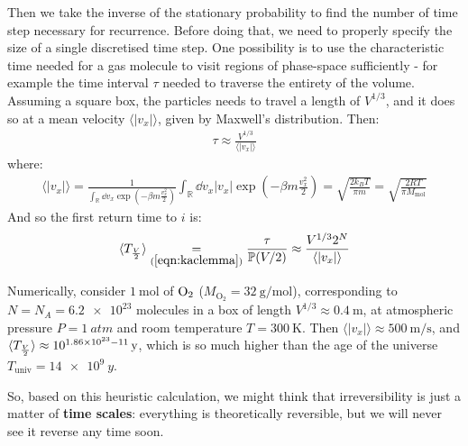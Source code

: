 \documentclass[../../main.tex]{subfiles}
\begin{document}
\medskip

Then we take the inverse of the stationary probability to find the number of time step necessary for recurrence. Before doing that, we need to properly specify the size of a single discretised time step. One possibility is to use the characteristic time needed for a gas molecule to visit regions of phase-space sufficiently  - for example the time interval $\tau$ needed to traverse the entirety of the volume. Assuming a square box, the particles needs to travel a length of $V^{1/3}$, and it does so at a mean velocity $\langle |v_x| \rangle$, given by Maxwell's distribution. Then:
\begin{align*}
    \tau \approx \frac{V^{1/3}}{\langle |v_x| \rangle} 
\end{align*}
where:
\begin{align*}
    \langle |v_x| \rangle = \frac{1}{{\int_{\mathbb{R}} \dd{v_x} \exp\left(-\beta m \frac{v_x^2}{2} \right)}}  \int_{\mathbb{R}} \dd{v_x} |v_x| {\exp(-\beta m \frac{v_x^2}{2} )} = \sqrt{\frac{2 k_B T}{\pi m}} = \sqrt{\frac{2 R T}{\pi M_{\mathrm{mol}}} }
\end{align*}
And so the first return time to $i$ is:
\begin{align*}
    \langle T_{\frac{V}{2}} \rangle \underset{(\ref{eqn:kaclemma})}{=} \frac{\tau}{\mathbb{P}(V/2)} \approx \frac{V^{1/3} 2^N}{\langle |v_x| \rangle} 
\end{align*}

Numerically, consider $\SI{1}{\mol}$ of $\rm{O}_2$ ($M_{\mathrm{O}_2} = \SI{32}{\g\per\mol}$), corresponding to $N=N_A = \num{6.2e23}$ molecules in a box of length $V^{1/3} \approx \SI{0.4}{\m}$, at atmospheric pressure $P=\SI{1}{atm}$ and room temperature $T= \SI{300}{\K}$. Then $\langle |v_x| \rangle \approx \SI{500}{\m\per\s}$, and $\langle T_{\frac{V}{2}} \rangle \approx 10^{1.86 \times 10^{23}-11}\,\rm{y}$, which is so much higher than the age of the universe $T_{\mathrm{univ}} = \SI{14e9}{y}$.

\medskip

So, based on this heuristic calculation, we might think that irreversibility is just a matter of \textbf{time scales}: everything is theoretically reversible, but we will never see it reverse any time soon.
\end{document}
